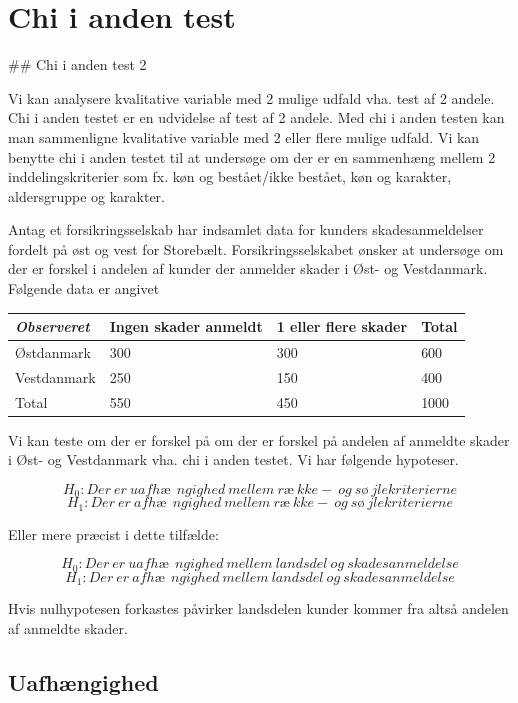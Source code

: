 \documentclass[]{book}
\begin{document}
\hypertarget{chi-i-anden-test}{%
\section{Chi i anden test}\label{chi-i-anden-test}}

\#\# Chi i anden test 2

Vi kan analysere kvalitative variable med 2 mulige udfald vha. test af 2 andele. Chi i anden testet er en udvidelse af test af 2 andele. Med chi i anden testen kan man sammenligne kvalitative variable med 2 eller flere mulige udfald. Vi kan benytte chi i anden testet til at undersøge om der er en sammenhæng mellem 2 inddelingskriterier som fx. køn og bestået/ikke bestået, køn og karakter, aldersgruppe og karakter.

Antag et forsikringsselskab har indsamlet data for kunders skadesanmeldelser fordelt på øst og vest for Storebælt. Forsikringsselskabet ønsker at undersøge om der er forskel i andelen af kunder der anmelder skader i Øst- og Vestdanmark. Følgende data er angivet

\begin{longtable}[]{@{}llll@{}}
\toprule
\textbf{\emph{Observeret}} & Ingen skader anmeldt & 1 eller flere skader & Total\tabularnewline
\midrule
\endhead
Østdanmark & 300 & 300 & 600\tabularnewline
Vestdanmark & 250 & 150 & 400\tabularnewline
Total & 550 & 450 & 1000\tabularnewline
\bottomrule
\end{longtable}

Vi kan teste om der er forskel på om der er forskel på andelen af anmeldte skader i Øst- og Vestdanmark vha. chi i anden testet. Vi har følgende hypoteser.

\[H_0: Der\ er\ uafhæ\ \ ngighed\ mellem\ ræ\ kke-\ og\ sø\ jlekriterierne\]\[H_1: Der\ er\ afhæ\ \ ngighed\ mellem\ ræ\ kke-\ og\ sø\ jlekriterierne\]

Eller mere præcist i dette tilfælde:

\[H_0: Der\ er\ uafhæ\ \ ngighed\ mellem\ landsdel\ og\ skadesanmeldelse\]\[H_1: Der\ er\ afhæ\ \ ngighed\ mellem\ landsdel\ og\ skadesanmeldelse\]

Hvis nulhypotesen forkastes påvirker landsdelen kunder kommer fra altså andelen af anmeldte skader.

\hypertarget{uafhngighed}{%
\subsection{Uafhængighed}\label{uafhngighed}}
\end{document}
